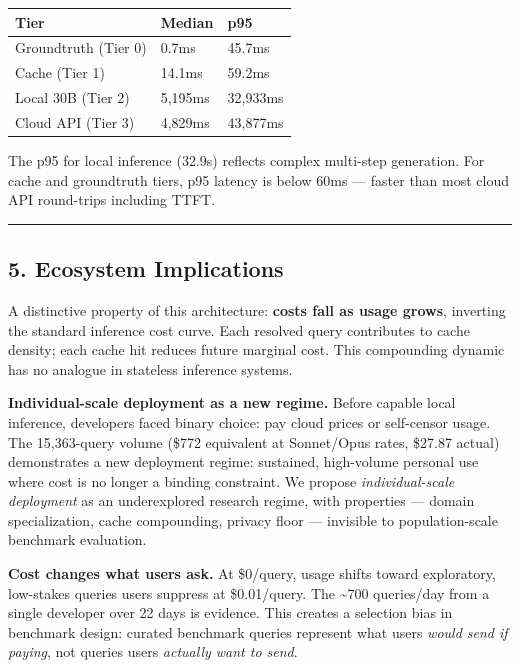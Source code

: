 {\def\LTcaptype{none} %
\begin{longtable}[]{@{}lll@{}}
\toprule\noalign{}
Tier & Median & p95 \\
\midrule\noalign{}
\endhead
\bottomrule\noalign{}
\endlastfoot
Groundtruth (Tier 0) & 0.7ms & 45.7ms \\
Cache (Tier 1) & 14.1ms & 59.2ms \\
Local 30B (Tier 2) & 5,195ms & 32,933ms \\
Cloud API (Tier 3) & 4,829ms & 43,877ms \\
\end{longtable}
}

The p95 for local inference (32.9s) reflects complex multi-step generation. For cache and groundtruth tiers, p95 latency is below 60ms --- faster than most cloud API round-trips including TTFT.

\begin{center}\rule{0.5\linewidth}{0.5pt}\end{center}

\subsection{5. Ecosystem Implications}\label{ecosystem-implications}

A distinctive property of this architecture: \textbf{costs fall as usage grows}, inverting the standard inference cost curve. Each resolved query contributes to cache density; each cache hit reduces future marginal cost. This compounding dynamic has no analogue in stateless inference systems.

\textbf{Individual-scale deployment as a new regime.} Before capable local inference, developers faced binary choice: pay cloud prices or self-censor usage. The 15,363-query volume (\$772 equivalent at Sonnet/Opus rates, \$27.87 actual) demonstrates a new deployment regime: sustained, high-volume personal use where cost is no longer a binding constraint. We propose \emph{individual-scale deployment} as an underexplored research regime, with properties --- domain specialization, cache compounding, privacy floor --- invisible to population-scale benchmark evaluation.

\textbf{Cost changes what users ask.} At \$0/query, usage shifts toward exploratory, low-stakes queries users suppress at \$0.01/query. The \textasciitilde700 queries/day from a single developer over 22 days is evidence. This creates a selection bias in benchmark design: curated benchmark queries represent what users \emph{would send if paying}, not queries users \emph{actually want to send}.

